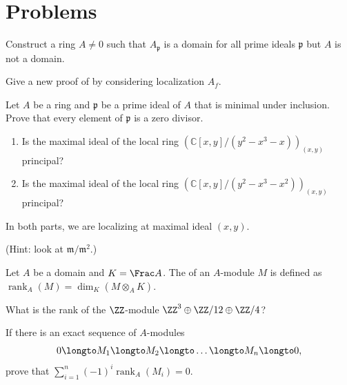 \section{Problems}
\begin{problem}
Construct a ring $A\neq 0$ such that $A_{\mathfrak p}$ is a domain for all prime ideals $\mathfrak p$ but $A$ is not a domain.
\end{problem}
\begin{problem}
Give a new proof of  
by considering localization $A_f$.
\end{problem}
\begin{problem}
Let $A$ be a ring and $\mathfrak p$ be a prime ideal of $A$ that is minimal under inclusion. Prove that every element of
$\mathfrak p$ is a zero divisor.
\end{problem}
\begin{problem}
\begin{enumerate}[label=(\alph*)]
\item Is the maximal ideal of the local ring $(\mathbb C[x,y]/(y^2-x^3-x))_{(x,y)}$ principal?
\item Is the maximal ideal of the local ring $(\mathbb C[x,y]/(y^2-x^3-x^2))_{(x,y)}$ principal?
\end{enumerate}
\noindent In both parts, we are localizing at maximal ideal $(x,y)$.

(Hint: look at $\mathfrak m/\mathfrak m^2$.)
\end{problem}
\begin{problem}
Let $A$ be a domain and $K=\Frac A$.
The  of an $A$-module $M$ is defined as 
$\operatorname{rank}_A(M) = \dim_K(M\otimes_A K)$.
\begin{alphenum}
\item What is the rank of the $\ZZ$-module 
$\ZZ^3 \oplus \ZZ/12 \oplus \ZZ/4$?
\item If there is an exact sequence of $A$-modules
$$0\longto M_1 \longto M_2 \longto \dots \longto M_n\longto 0,$$
prove that $\sum_{i=1}^n (-1)^i\operatorname{rank}_A(M_i) = 0$.
\end{alphenum}
\end{problem}
